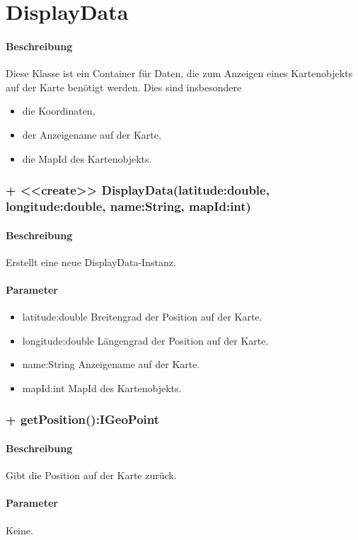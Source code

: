 \section{DisplayData}
\paragraph*{Beschreibung}
Diese Klasse ist ein Container für Daten, die zum Anzeigen eines Kartenobjekts auf der 
Karte benötigt werden. Dies sind insbesondere
\begin{itemize}
    \item die Koordinaten,
    \item der Anzeigename auf der Karte,
    \item die MapId des Kartenobjekts.
\end{itemize}

\subsubsection{+ <<create>> DisplayData(latitude:double, longitude:double, name:String, mapId:int)}%
\paragraph*{Beschreibung}
Erstellt eine neue DisplayData-Instanz.
\paragraph*{Parameter}
\begin{itemize}
    \item latitude:double Breitengrad der Position auf der Karte.
    \item longitude:double Längengrad der Position auf der Karte.
    \item name:String Anzeigename auf der Karte.
    \item mapId:int MapId des Kartenobjekts.
\end{itemize}

\subsubsection{+ getPosition():IGeoPoint}%
\paragraph*{Beschreibung}
Gibt die Position auf der Karte zurück.
\paragraph*{Parameter}
Keine.
